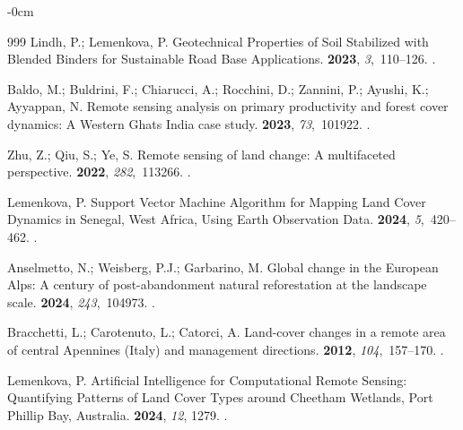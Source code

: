 \documentclass[jimaging,article,accept,pdftex,oneauthor]{Definitions/mdpi}
\begin{document}
\begin{adjustwidth}{-\extralength}{0cm}
\begin{thebibliography}{999}
Lindh, P.; Lemenkova, P.
\newblock Geotechnical Properties of Soil Stabilized with Blended Binders for
  Sustainable Road Base Applications.
 {\bf 2023}, {\em 3},~110--126.
.

Baldo, M.; Buldrini, F.; Chiarucci, A.; Rocchini, D.; Zannini, P.; Ayushi, K.;
  Ayyappan, N.
\newblock Remote sensing analysis on primary productivity and forest cover
  dynamics: A Western Ghats India case study.
 {\bf 2023}, {\em 73},~101922.
.

Zhu, Z.; Qiu, S.; Ye, S.
\newblock Remote sensing of land change: A multifaceted perspective.
 {\bf 2022}, {\em 282},~113266.
.

Lemenkova, P.
\newblock Support Vector Machine Algorithm for Mapping Land Cover Dynamics in
  Senegal, West Africa, Using Earth Observation Data.
 {\bf 2024}, {\em 5},~420--462.
.

Anselmetto, N.; Weisberg, P.J.; Garbarino, M.
\newblock Global change in the European Alps: A century of post-abandonment
  natural reforestation at the landscape scale.
 {\bf 2024}, {\em 243},~104973.
.

Bracchetti, L.; Carotenuto, L.; Catorci, A.
\newblock Land-cover changes in a remote area of central Apennines (Italy) and
  management directions.
 {\bf 2012}, {\em 104},~157--170.
.

Lemenkova, P.
\newblock Artificial Intelligence for Computational Remote Sensing: Quantifying
  Patterns of Land Cover Types around Cheetham Wetlands, Port Phillip Bay,
  Australia.
 {\bf 2024}, {\em 12}, {1279}.
.


\end{thebibliography}
\end{adjustwidth}
\end{document}
